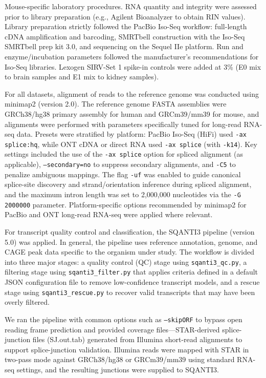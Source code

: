 \documentclass[pdflatex,sn-nature]{sn-jnl}%
\begin{document}
Mouse-specific laboratory procedures. RNA quantity and integrity were assessed prior to library preparation (e.g., Agilent Bioanalyzer to obtain RIN values). Library preparation strictly followed the PacBio Iso-Seq workflow: full-length cDNA amplification and barcoding, SMRTbell construction with the Iso-Seq SMRTbell prep kit 3.0, and sequencing on the Sequel IIe platform. Run and enzyme/incubation parameters followed the manufacturer's recommendations for Iso-Seq libraries. Lexogen SIRV-Set 1 spike-in controls were added at 3\% (E0 mix to brain samples and E1 mix to kidney samples).

For all datasets, alignment of reads to the reference genome was conducted using minimap2 (version 2.0). The reference genome FASTA assemblies were GRCh38/hg38 primary assembly for human and GRCm39/mm39 for mouse, and alignments were performed with parameters specifically tuned for long-read RNA-seq data. Presets were stratified by platform: PacBio Iso-Seq (HiFi) used \texttt{-ax splice:hq}, while ONT cDNA or direct RNA used \texttt{-ax splice} (with \texttt{-k14}). Key settings included the use of the \texttt{-ax splice} option for spliced alignment (as applicable), \texttt{--secondary=no} to suppress secondary alignments, and \texttt{-C5} to penalize ambiguous mappings. The flag \texttt{-uf} was enabled to guide canonical splice-site discovery and strand/orientation inference during spliced alignment, and the maximum intron length was set to 2,000,000 nucleotides via the \texttt{-G 2000000} parameter. Platform-specific options recommended by minimap2 for PacBio and ONT long-read RNA-seq were applied where relevant.

For transcript quality control and classification, the SQANTI3 pipeline (version 5.0) was applied. In general, the pipeline uses reference annotation, genome, and CAGE peak data specific to the organism under study. The workflow is divided into three major stages: a quality control (QC) stage using \texttt{sqanti3\_qc.py}, a filtering stage using \texttt{sqanti3\_filter.py} that applies criteria defined in a default JSON configuration file to remove low-confidence transcript models, and a rescue stage using \texttt{sqanti3\_rescue.py} to recover valid transcripts that may have been overly filtered\cite{PardoPalacios2024SQANTI3}.

We ran the pipeline with common options such as \texttt{--skipORF} to bypass open reading frame prediction and provided coverage files---STAR-derived splice-junction files (SJ.out.tab) generated from Illumina short-read alignments to support splice-junction validation. Illumina reads were mapped with STAR in two-pass mode against GRCh38/hg38 or GRCm39/mm39 using standard RNA-seq settings, and the resulting junctions were supplied to SQANTI3.
\end{document}

